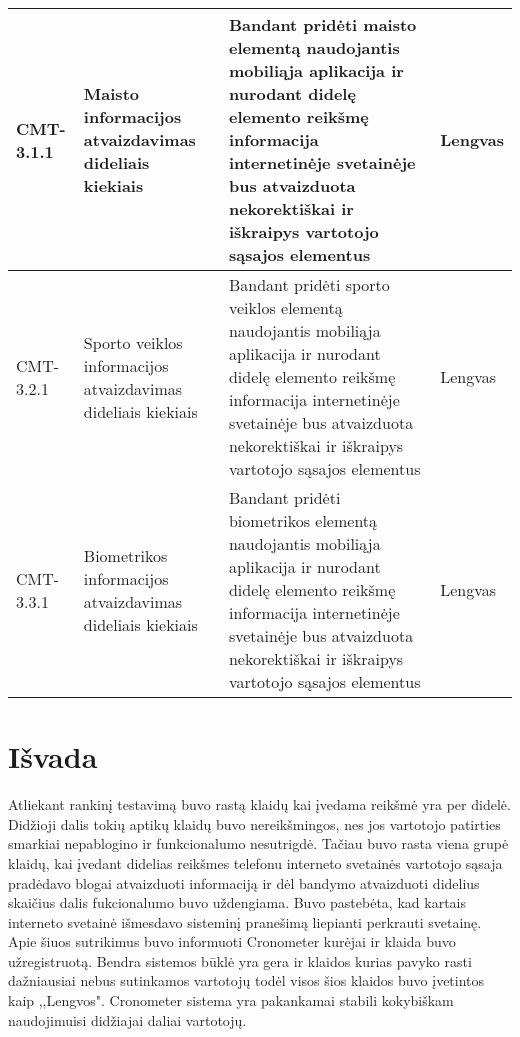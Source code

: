 \documentclass[oneside]{VUMIFPSkursinis}
\begin{document}
\begin{center}
    \begin{tabular}{ |p{1cm}| p{7cm} | p{7cm} | p{2cm} |}
    \hline
    CMT-3.1.1 & Maisto informacijos atvaizdavimas dideliais kiekiais & Bandant pridėti maisto elementą naudojantis mobiliąja aplikacija ir nurodant didelę elemento reikšmę informacija internetinėje svetainėje bus atvaizduota nekorektiškai ir iškraipys vartotojo sąsajos elementus & Lengvas \\ \hline
    CMT-3.2.1 & Sporto veiklos informacijos atvaizdavimas dideliais kiekiais & Bandant pridėti sporto veiklos elementą naudojantis mobiliąja aplikacija ir nurodant didelę elemento reikšmę informacija internetinėje svetainėje bus atvaizduota nekorektiškai ir iškraipys vartotojo sąsajos elementus & Lengvas \\ \hline
    CMT-3.3.1 & Biometrikos informacijos atvaizdavimas dideliais kiekiais & Bandant pridėti biometrikos elementą naudojantis mobiliąja aplikacija ir nurodant didelę elemento reikšmę informacija internetinėje svetainėje bus atvaizduota nekorektiškai ir iškraipys vartotojo sąsajos elementus & Lengvas \\ \hline   
   \hline
    \end{tabular}
\end{center}

\section{Išvada}
Atliekant rankinį testavimą buvo rastą klaidų kai įvedama reikšmė yra per didelė. Didžioji dalis tokių aptikų klaidų buvo nereikšmingos, nes jos vartotojo patirties smarkiai nepablogino ir funkcionalumo nesutrigdė. Tačiau buvo rasta viena grupė klaidų, kai įvedant didelias reikšmes telefonu interneto svetainės vartotojo sąsaja pradėdavo blogai atvaizduoti informaciją ir dėl bandymo atvaizduoti didelius skaičius dalis fukcionalumo buvo uždengiama. Buvo pastebėta, kad kartais interneto svetainė išmesdavo sisteminį pranešimą liepianti perkrauti svetainę. Apie šiuos sutrikimus buvo informuoti Cronometer kurėjai ir klaida buvo užregistruotą. Bendra sistemos būklė yra gera ir klaidos kurias pavyko rasti dažniausiai nebus sutinkamos vartotojų todėl visos šios klaidos buvo įvetintos kaip ,,Lengvos". Cronometer sistema yra pakankamai stabili kokybiškam naudojimuisi didžiajai daliai vartotojų.

	
\end{document}
